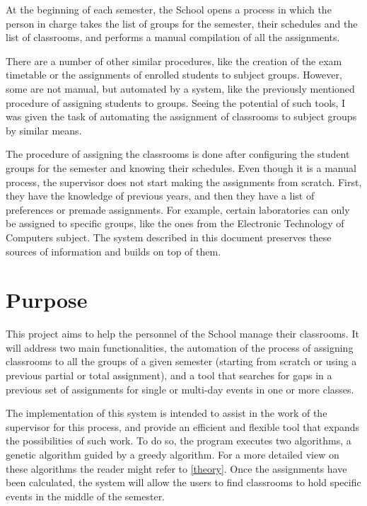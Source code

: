 At the beginning of each semester, the School opens a process in which the person in charge takes the list of groups for the semester, their schedules and the list of classrooms, and performs a manual compilation of all the assignments.

There are a number of other similar procedures, like the creation of the exam timetable or the assignments of enrolled students to subject groups. However, some are not manual, but automated by a system, like the previously mentioned procedure of assigning students to groups. Seeing the potential of such tools, I was given the task of automating the assignment of classrooms to subject groups by similar means. 

The procedure of assigning the classrooms is done after configuring the student groups for the semester and knowing their schedules. Even though it is a manual process, the supervisor does not start making the assignments from scratch. First, they have the knowledge of previous years, and then they have a list of preferences or premade assignments. For example, certain laboratories can only be assigned to specific groups, like the ones from the Electronic Technology of Computers subject. The system described in this document preserves these sources of information and builds on top of them.


\section{Purpose}\label{purpose}

This project aims to help the personnel of the School manage their classrooms. It will address two main functionalities, the automation of the process of assigning classrooms to all the groups of a given semester (starting from scratch or using a previous partial or total assignment), and a tool that searches for gaps in a previous set of assignments for single or multi-day events in one or more classes.

The implementation of this system is intended to assist in the work of the supervisor for this process, and provide an efficient and flexible tool that expands the possibilities of such work. To do so, the program executes two algorithms, a genetic algorithm guided by a greedy algorithm. For a more detailed view on these algorithms the reader might refer to \ref{theory}. Once the assignments have been calculated, the system will allow the users to find classrooms to hold specific events in the middle of the semester.

